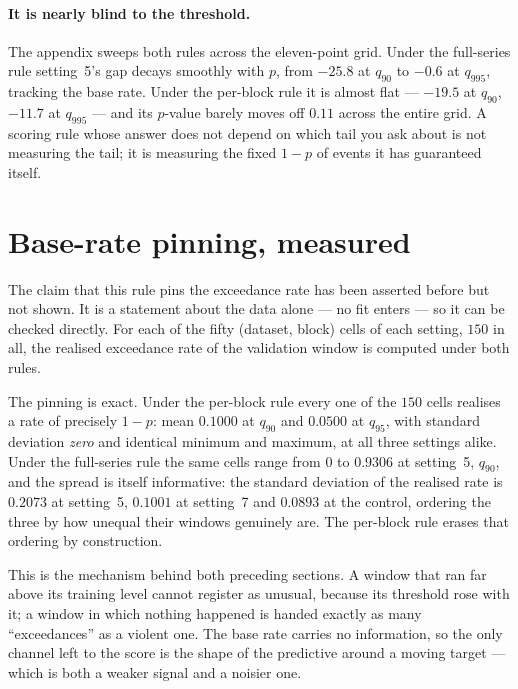 \documentclass[11pt]{article}
\newcommand{\tblpath}{../../code/analysis/time_block_forecast/simstudy/output/tables}
\newcommand{\tbl}[1]{}
\begin{document}
\paragraph{It is nearly blind to the threshold.} The appendix sweeps
both rules across the eleven-point grid. Under the full-series rule
setting~5's gap decays smoothly with $p$, from $-25.8$ at $q_{90}$ to
$-0.6$ at $q_{995}$, tracking the base rate. Under the per-block rule it
is almost flat --- $-19.5$ at $q_{90}$, $-11.7$ at $q_{995}$ --- and its
$p$-value barely moves off $0.11$ across the entire grid. A scoring rule
whose answer does not depend on which tail you ask about is not
measuring the tail; it is measuring the fixed $1-p$ of events it has
guaranteed itself.

\section{Base-rate pinning, measured}
\label{sec:pinning}

The claim that this rule pins the exceedance rate has been asserted
before but not shown. It is a statement about the data alone --- no fit
enters --- so it can be checked directly. For each of the fifty
(dataset, block) cells of each setting, $150$ in all, the realised
exceedance rate of the validation window is computed under both rules.

\tbl{expA_pinning}

\noindent The pinning is exact. Under the per-block rule every one of the
$150$ cells realises a rate of precisely $1-p$: mean $0.1000$ at
$q_{90}$ and $0.0500$ at $q_{95}$, with standard deviation \emph{zero}
and identical minimum and maximum, at all three settings alike. Under the
full-series rule the same cells range from $0$ to $0.9306$ at setting~5,
$q_{90}$, and the spread is itself informative: the standard deviation of
the realised rate is $0.2073$ at setting~5, $0.1001$ at setting~7 and
$0.0893$ at the control, ordering the three by how unequal their windows
genuinely are. The per-block rule erases that ordering by construction.

This is the mechanism behind both preceding sections. A window that ran
far above its training level cannot register as unusual, because its
threshold rose with it; a window in which nothing happened is handed
exactly as many ``exceedances'' as a violent one. The base rate carries
no information, so the only channel left to the score is the shape of the
predictive around a moving target --- which is both a weaker signal and a
noisier one.
\end{document}
